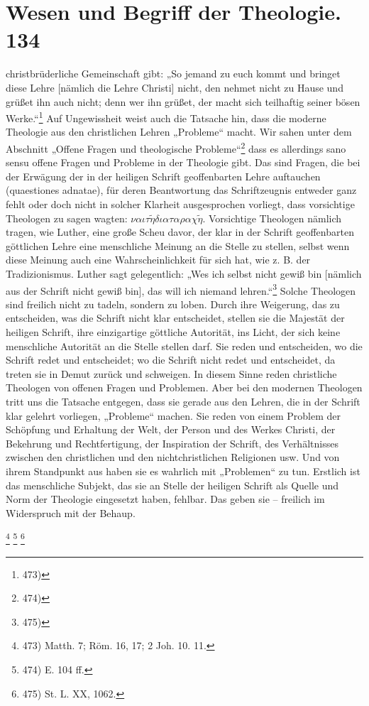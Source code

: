 \section*{Wesen und Begriff der Theologie. \hfill 134}

christbrüderliche Gemeinschaft gibt: „So jemand zu euch kommt und bringet diese Lehre [nämlich die Lehre Christi] nicht, den nehmet nicht zu Hause und grüßet ihn auch nicht; denn wer ihn grüßet, der macht sich teilhaftig seiner bösen Werke.“\footnote{473)}
Auf Ungewissheit weist auch die Tatsache hin, dass die moderne Theologie aus den christlichen Lehren „Probleme“ macht. Wir sahen unter dem Abschnitt „Offene Fragen und theologische Probleme“\footnote{474)} dass es allerdings sano sensu offene Fragen und Probleme in der Theologie gibt. Das sind Fragen, die bei der Erwägung der in der heiligen Schrift geoffenbarten Lehre auftauchen (quaestiones adnatae), für deren Beantwortung das Schriftzeugnis entweder ganz fehlt oder doch nicht in solcher Klarheit ausgesprochen vorliegt, dass vorsichtige Theologen zu sagen wagten: \foreignlanguage{greek}{$\nu\alpha\iota \tau\tilde{\eta} \delta\iota\alpha\tau\alpha\rho\alpha\chi\tilde{\eta}$}. Vorsichtige Theologen nämlich tragen, wie Luther, eine große Scheu davor, der klar in der Schrift geoffenbarten göttlichen Lehre eine menschliche Meinung an die Stelle zu stellen, selbst wenn diese Meinung auch eine Wahrscheinlichkeit für sich hat, wie z. B. der Tradizionismus. Luther sagt gelegentlich: „Wes ich selbst nicht gewiß bin [nämlich aus der Schrift nicht gewiß bin], das will ich niemand lehren.“\footnote{475)} Solche Theologen sind freilich nicht zu tadeln, sondern zu loben. Durch ihre Weigerung, das zu entscheiden, was die Schrift nicht klar entscheidet, stellen sie die Majestät der heiligen Schrift, ihre einzigartige göttliche Autorität, ins Licht, der sich keine menschliche Autorität an die Stelle stellen darf. Sie reden und entscheiden, wo die Schrift redet und entscheidet; wo die Schrift nicht redet und entscheidet, da treten sie in Demut zurück und schweigen. In diesem Sinne reden christliche Theologen von offenen Fragen und Problemen. Aber bei den modernen Theologen tritt uns die Tatsache entgegen, dass sie gerade aus den Lehren, die in der Schrift klar gelehrt vorliegen, „Probleme“ machen. Sie reden von einem Problem der Schöpfung und Erhaltung der Welt, der Person und des Werkes Christi, der Bekehrung und Rechtfertigung, der Inspiration der Schrift, des Verhältnisses zwischen den christlichen und den nichtchristlichen Religionen usw. Und von ihrem Standpunkt aus haben sie es wahrlich mit „Problemen“ zu tun. Erstlich ist das menschliche Subjekt, das sie an Stelle der heiligen Schrift als Quelle und Norm der Theologie eingesetzt haben, fehlbar. Das geben sie – freilich im Widerspruch mit der Behaup.

\vfill
\noindent
\footnote{473) Matth. 7; Röm. 16, 17; 2 Joh. 10. 11.}
\footnote{474) E. 104 ff.}
\footnote{475) St. L. XX, 1062.}
